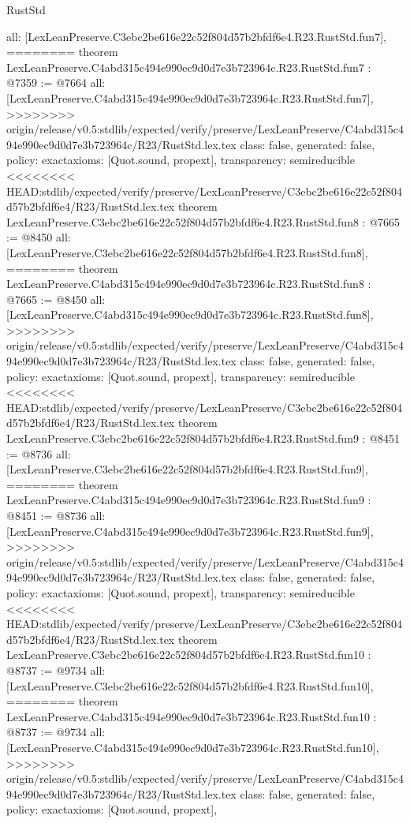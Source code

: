 \begin{lexlean}{RustStd}
\begin{coremodule}
{\begin{coremodule}
{{{{{{{{{{  all: [LexLeanPreserve.C3ebc2be616e22c52f804d57b2bfdf6e4.R23.RustStd.fun7],
========
theorem LexLeanPreserve.C4abd315c494e990ec9d0d7e3b723964c.R23.RustStd.fun7 : @7359 := @7664 {
  all: [LexLeanPreserve.C4abd315c494e990ec9d0d7e3b723964c.R23.RustStd.fun7],
>>>>>>>> origin/release/v0.5:stdlib/expected/verify/preserve/LexLeanPreserve/C4abd315c494e990ec9d0d7e3b723964c/R23/RustStd.lex.tex
  class: false,
  generated: false,
  policy: exact{axioms: [Quot.sound, propext]},
  transparency: semireducible
}
<<<<<<<< HEAD:stdlib/expected/verify/preserve/LexLeanPreserve/C3ebc2be616e22c52f804d57b2bfdf6e4/R23/RustStd.lex.tex
theorem LexLeanPreserve.C3ebc2be616e22c52f804d57b2bfdf6e4.R23.RustStd.fun8 : @7665 := @8450 {
  all: [LexLeanPreserve.C3ebc2be616e22c52f804d57b2bfdf6e4.R23.RustStd.fun8],
========
theorem LexLeanPreserve.C4abd315c494e990ec9d0d7e3b723964c.R23.RustStd.fun8 : @7665 := @8450 {
  all: [LexLeanPreserve.C4abd315c494e990ec9d0d7e3b723964c.R23.RustStd.fun8],
>>>>>>>> origin/release/v0.5:stdlib/expected/verify/preserve/LexLeanPreserve/C4abd315c494e990ec9d0d7e3b723964c/R23/RustStd.lex.tex
  class: false,
  generated: false,
  policy: exact{axioms: [Quot.sound, propext]},
  transparency: semireducible
}
<<<<<<<< HEAD:stdlib/expected/verify/preserve/LexLeanPreserve/C3ebc2be616e22c52f804d57b2bfdf6e4/R23/RustStd.lex.tex
theorem LexLeanPreserve.C3ebc2be616e22c52f804d57b2bfdf6e4.R23.RustStd.fun9 : @8451 := @8736 {
  all: [LexLeanPreserve.C3ebc2be616e22c52f804d57b2bfdf6e4.R23.RustStd.fun9],
========
theorem LexLeanPreserve.C4abd315c494e990ec9d0d7e3b723964c.R23.RustStd.fun9 : @8451 := @8736 {
  all: [LexLeanPreserve.C4abd315c494e990ec9d0d7e3b723964c.R23.RustStd.fun9],
>>>>>>>> origin/release/v0.5:stdlib/expected/verify/preserve/LexLeanPreserve/C4abd315c494e990ec9d0d7e3b723964c/R23/RustStd.lex.tex
  class: false,
  generated: false,
  policy: exact{axioms: [Quot.sound, propext]},
  transparency: semireducible
}
<<<<<<<< HEAD:stdlib/expected/verify/preserve/LexLeanPreserve/C3ebc2be616e22c52f804d57b2bfdf6e4/R23/RustStd.lex.tex
theorem LexLeanPreserve.C3ebc2be616e22c52f804d57b2bfdf6e4.R23.RustStd.fun10 : @8737 := @9734 {
  all: [LexLeanPreserve.C3ebc2be616e22c52f804d57b2bfdf6e4.R23.RustStd.fun10],
========
theorem LexLeanPreserve.C4abd315c494e990ec9d0d7e3b723964c.R23.RustStd.fun10 : @8737 := @9734 {
  all: [LexLeanPreserve.C4abd315c494e990ec9d0d7e3b723964c.R23.RustStd.fun10],
>>>>>>>> origin/release/v0.5:stdlib/expected/verify/preserve/LexLeanPreserve/C4abd315c494e990ec9d0d7e3b723964c/R23/RustStd.lex.tex
  class: false,
  generated: false,
  policy: exact{axioms: [Quot.sound, propext]},
}}}}}}}}}}}}}}
\end{coremodule}}
\end{coremodule}
\end{lexlean}
